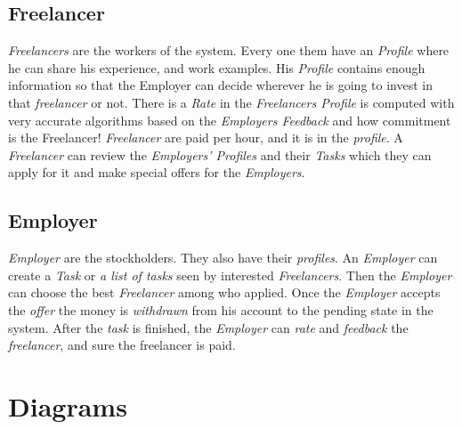 \documentclass{article}
\begin{document}
\subsection{Freelancer}
\hspace{0.5cm} \textit{Freelancers} are the workers of the system.
Every one them have an \textit{Profile} where he can share his experience,
and work examples. His \textit{Profile} contains enough information
so that the Employer can decide wherever he is going to invest in that
\textit{freelancer} or not.
There is a \textit{Rate} in the \textit{Freelancers Profile} is computed
with very accurate algorithms based on the \textit{Employers Feedback}
and how commitment is the Freelancer!
\textit{Freelancer} are paid per hour, and it is in the \textit{profile}.
A \textit{Freelancer} can review the \textit{Employers' Profiles} and
their \textit{Tasks} which they can apply for it and make special offers
for the \textit{Employers}.


\subsection{Employer}
\hspace{0.5cm} \textit{Employer} are the stockholders. They also have
their \textit{profiles}. An \textit{Employer} can create a \textit{Task} or
\textit{a list of tasks} seen  by interested \textit{Freelancers}.
Then the \textit{Employer} can choose the best \textit{Freelancer} among who
applied. Once the \textit{Employer} accepts the \textit{offer}
the money is \textit{withdrawn} from his account to the pending state in
the system. After the \textit{task} is finished, the \textit{Employer} can
\textit{rate} and \textit{feedback} the \textit{freelancer},
and sure the freelancer is paid.



\section {Diagrams}
\end{document}
